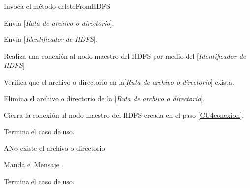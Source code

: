 
\begin{UCtrayectoria}

\UCpaso[\UCactor] Invoca el método deleteFromHDFS

\UCpaso[\UCactor] Envía [{\em Ruta de archivo o directorio}].

\UCpaso[\UCactor] Envía [{\em Identificador de HDFS}].

\UCpaso[\UCsist] Realiza una conexión al nodo maestro del HDFS por medio del [{\em Identificador de HDFS}]\label{CU4conexion}

\UCpaso[\UCsist] Verifica que el archivo o directorio en la[{\em Ruta de archivo o directorio}] exista. 

\UCpaso[\UCsist] Elimina el archivo o directorio de la [{\em Ruta de archivo o directorio}].

\UCpaso[\UCsist] Cierra la conexión al nodo maestro del HDFS creada en el paso \ref{CU4conexion}.

\UCpaso[] Termina el caso de uso.

\end{UCtrayectoria}




\begin{UCtrayectoriaA}{A}{No existe el archivo o directorio}

	\UCpaso Manda el Mensaje .

	\UCpaso[] Termina el caso de uso.

\end{UCtrayectoriaA}




